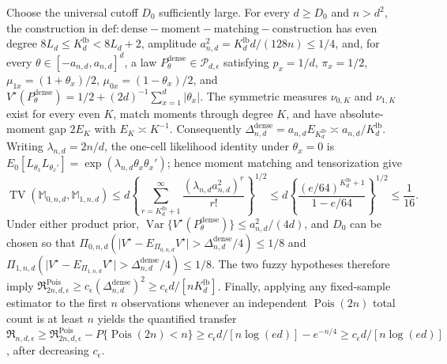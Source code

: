 Choose the universal cutoff \(D_0\) sufficiently large. For every \(d\geq D_0\) and \(n>d^2\), the construction in \(\mathrm{def:dense-moment-matching-construction}\) has even degree \(8L_d\leq K_d^{\mathrm{lb}}<8L_d+2\), amplitude \(a_{n,d}^2=K_d^{\mathrm{lb}}d/(128n)\leq1/4\), and, for every \(\theta\in[-a_{n,d},a_{n,d}]^d\), a law \(P_\theta^{\mathrm{dense}}\in\mathcal P_{d,\epsilon}\) satisfying \(p_x=1/d\), \(\pi_x=1/2\), \(\mu_{1x}=(1+\theta_x)/2\), \(\mu_{0x}=(1-\theta_x)/2\), and \(V^\star(P_\theta^{\mathrm{dense}})=1/2+(2d)^{-1}\sum_{x=1}^d\lvert\theta_x\rvert\). The symmetric measures \(\nu_{0,K}\) and \(\nu_{1,K}\) exist for every even \(K\), match moments through degree \(K\), and have absolute-moment gap \(2E_K\) with \(E_K\asymp K^{-1}\). Consequently \(\Delta_{n,d}^{\mathrm{dense}}=a_{n,d}E_{K_d^{\mathrm{lb}}}\asymp a_{n,d}/K_d^{\mathrm{lb}}\). Writing \(\lambda_{n,d}=2n/d\), the one-cell likelihood identity under \(\theta_x=0\) is \(E_0[L_{\theta_x}L_{\theta_x'}]=\exp(\lambda_{n,d}\theta_x\theta_x')\); hence moment matching and tensorization give \[\operatorname{TV}(\mathbb M_{0,n,d},\mathbb M_{1,n,d})\leq d\left\{\sum_{r=K_d^{\mathrm{lb}}+1}^{\infty}\frac{(\lambda_{n,d}a_{n,d}^2)^r}{r!}\right\}^{1/2}\leq d\left\{\frac{(e/64)^{K_d^{\mathrm{lb}}+1}}{1-e/64}\right\}^{1/2}\leq\frac1{16}.\] Under either product prior, \(\operatorname{Var}\{V^\star(P_\theta^{\mathrm{dense}})\}\leq a_{n,d}^2/(4d)\), and \(D_0\) can be chosen so that \(\Pi_{0,n,d}(\lvert V^\star-E_{\Pi_{0,n,d}}V^\star\rvert>\Delta_{n,d}^{\mathrm{dense}}/4)\leq1/8\) and \(\Pi_{1,n,d}(\lvert V^\star-E_{\Pi_{1,n,d}}V^\star\rvert>\Delta_{n,d}^{\mathrm{dense}}/4)\leq1/8\). The two fuzzy hypotheses therefore imply \(\mathfrak R^{\mathrm{Pois}}_{2n,d,\epsilon}\geq c_\epsilon(\Delta_{n,d}^{\mathrm{dense}})^2\geq c_\epsilon d/[nK_d^{\mathrm{lb}}]\). Finally, applying any fixed-sample estimator to the first \(n\) observations whenever an independent \(\operatorname{Pois}(2n)\) total count is at least \(n\) yields the quantified transfer \(\mathfrak R_{n,d,\epsilon}\geq\mathfrak R^{\mathrm{Pois}}_{2n,d,\epsilon}-P\{\operatorname{Pois}(2n)<n\}\geq c_\epsilon d/[n\log(ed)]-e^{-n/4}\geq c_\epsilon d/[n\log(ed)]\), after decreasing \(c_\epsilon\).